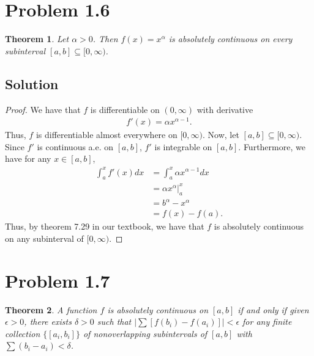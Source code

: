 \documentclass[10pt,a4paper]{article}
\author{Jeremiah Givens}
\theoremstyle{theorem}
\newtheorem{theorem}{Theorem}
\theoremstyle{definition}
\begin{document}
\section*{Problem 1.6}
\begin{theorem}
Let $\alpha > 0$. Then $f(x) = x^\alpha$ is absolutely continuous on every subinterval $[a, b] \subseteq [0, \infty)$.
\end{theorem}

\subsection*{Solution}
\begin{proof}
We have that $f$ is differentiable on $(0, \infty)$ with derivative
\begin{align*}
f'(x) = \alpha x^{\alpha - 1}.
\end{align*}
Thus, $f$ is differentiable almost everywhere on $[0, \infty)$. Now, let $[a, b] \subseteq [0, \infty)$. Since $f'$ is continuous a.e. on $[a, b]$, $f'$ is integrable on $[a, b]$. Furthermore, we have for any $x \in [a, b]$,
\begin{align*}
\int_a^x f'(x) dx &= \int_a^x \alpha x^{\alpha - 1} dx\\
&= \left. \alpha x^{\alpha} \right|_a^x\\
&= b^\alpha - x^\alpha\\
&= f(x) - f(a).
\end{align*}
Thus, by theorem 7.29 in our textbook, we have that $f$ is absolutely continuous on any subinterval of $[0, \infty)$.
\end{proof}

\section*{Problem 1.7}
\begin{theorem}
A function $f$ is absolutely continuous on $[a, b]$ if and only if given $\epsilon > 0$, there exists $\delta > 0$ such that $|\sum [f(b_i) - f(a_i)]| < \epsilon$ for any finite collection $\{[a_i, b_i]\}$ of nonoverlapping subintervals of $[a, b]$ with $\sum (b_i - a_i) < \delta$.
\end{theorem}
\end{document}
